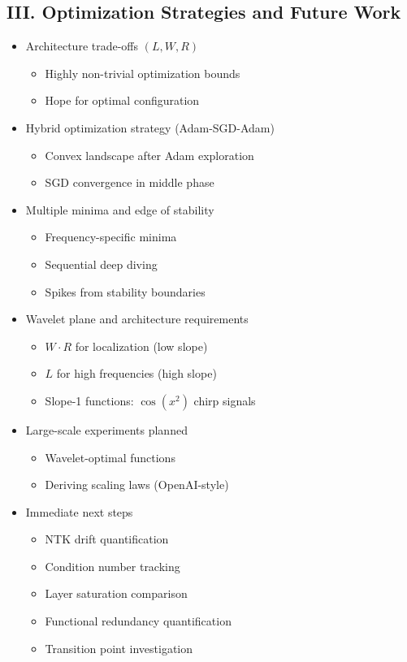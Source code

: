 \documentclass[12pt]{article}
\begin{document}
\subsection*{III. Optimization Strategies and Future Work}
\begin{itemize}
    \item Architecture trade-offs $(L, W, R)$
    \begin{itemize}
        \item Highly non-trivial optimization bounds
        \item Hope for optimal configuration
    \end{itemize}
    \item Hybrid optimization strategy (Adam-SGD-Adam)
    \begin{itemize}
        \item Convex landscape after Adam exploration
        \item SGD convergence in middle phase
    \end{itemize}
    \item Multiple minima and edge of stability
    \begin{itemize}
        \item Frequency-specific minima
        \item Sequential deep diving
        \item Spikes from stability boundaries
    \end{itemize}
    \item Wavelet plane and architecture requirements
    \begin{itemize}
        \item $W \cdot R$ for localization (low slope)
        \item $L$ for high frequencies (high slope)
        \item Slope-1 functions: $\cos(x^2)$ chirp signals
    \end{itemize}
    \item Large-scale experiments planned
    \begin{itemize}
        \item Wavelet-optimal functions
        \item Deriving scaling laws (OpenAI-style)
    \end{itemize}
    \item Immediate next steps
    \begin{itemize}
        \item NTK drift quantification
        \item Condition number tracking
        \item Layer saturation comparison
        \item Functional redundancy quantification
        \item Transition point investigation
    \end{itemize}
\end{itemize}
\end{document}
